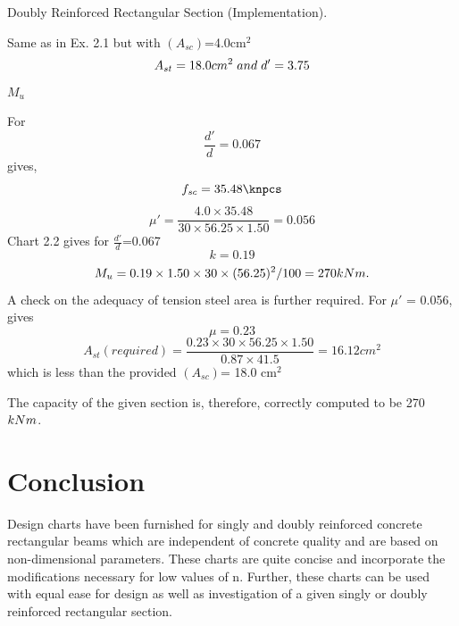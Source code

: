 \begin{example} Doubly Reinforced Rectangular Section (Implementation).

\given  Same as in Ex. 2.1 but with $(A_{sc})$=4.0cm$^{2}$
$$A_{st}=18.0cm^2 \hspace{0.1cm}and\hspace{0.1cm} d'=3.75$$
\required $M_u$

\solution For
$$\frac{d'}{d}=0.067$$  gives,
$$f_{sc}=35.48\knpcs$$
$$\mu'=\frac{4.0 \times 35.48}{30 \times 56.25 \times 1.50}=0.056$$
Chart 2.2 gives for $\frac{d'}{d}$=0.067
$$k=0.19$$
$$M_u= 0.19 \times 1.50 \times 30 \times (56.25)^2/100=270kNm.$$ 
A check on the adequacy of tension steel area is further required. For $\mu'$ = 0.056, 
gives
$$\mu=0.23$$
$$A_{st}(required)=\frac{0.23 \times 30 \times 56.25 \times 1.50}{0.87 \times 41.5}=16.12cm^2$$
which is less than the provided $(A_{sc})$= 18.0 cm$^{2}$

The capacity of the given section is, therefore, correctly computed to be 270 $kNm$.
\end{example}
\newpage
\section{Conclusion}
Design charts have been furnished for singly and doubly reinforced concrete rectangular
beams which are independent of concrete quality and are based on non-dimensional
parameters. These charts are quite concise and incorporate the modiﬁcations necessary for
low values of n. Further, these charts can be used with equal ease for design as well as
investigation of a given singly or doubly reinforced rectangular section.





